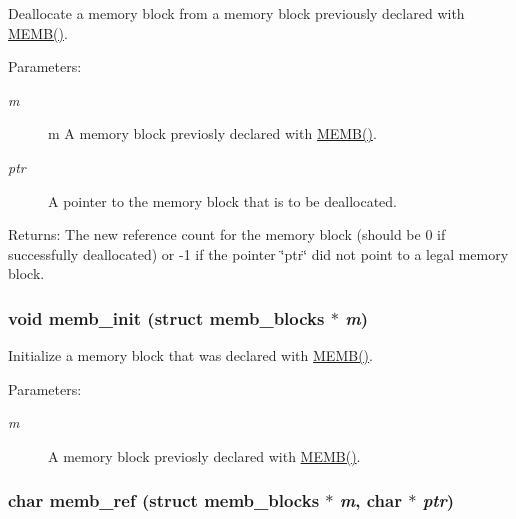 Deallocate a memory block from a memory block previously declared with \hyperlink{a00060_g8457539d6a6eaecded820f4042b8314a}{MEMB()}. 

\begin{Desc}
\item[Parameters:]
\begin{description}
\item[{\em m}]m A memory block previosly declared with \hyperlink{a00060_g8457539d6a6eaecded820f4042b8314a}{MEMB()}.\item[{\em ptr}]A pointer to the memory block that is to be deallocated.\end{description}
\end{Desc}
\begin{Desc}
\item[Returns:]The new reference count for the memory block (should be 0 if successfully deallocated) or -1 if the pointer \char`\"{}ptr\char`\"{} did not point to a legal memory block. \end{Desc}
\hypertarget{a00060_gd58a6c7e62ae59bf7a016ded12ca2910}{
\subsubsection[memb\_\-init]{\setlength{\rightskip}{0pt plus 5cm}void memb\_\-init (struct memb\_\-blocks $\ast$ {\em m})}}
\label{a00060_gd58a6c7e62ae59bf7a016ded12ca2910}


Initialize a memory block that was declared with \hyperlink{a00060_g8457539d6a6eaecded820f4042b8314a}{MEMB()}. 

\begin{Desc}
\item[Parameters:]
\begin{description}
\item[{\em m}]A memory block previosly declared with \hyperlink{a00060_g8457539d6a6eaecded820f4042b8314a}{MEMB()}. \end{description}
\end{Desc}
\hypertarget{a00060_ga02c1627ee9488468c8cdef7fed74d91}{
\subsubsection[memb\_\-ref]{\setlength{\rightskip}{0pt plus 5cm}char memb\_\-ref (struct memb\_\-blocks $\ast$ {\em m}, char $\ast$ {\em ptr})}}
\label{a00060_ga02c1627ee9488468c8cdef7fed74d91}


